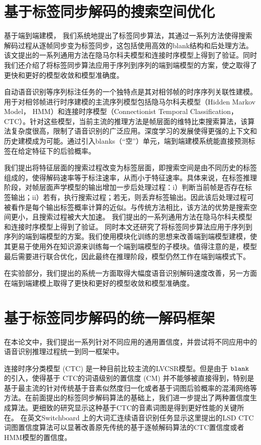 \section{基于标签同步解码的搜索空间优化}
\label{chap:sum-lsd}

基于端到端建模，
我们系统地提出了标签同步算法，其通过一系列方法使得搜索解码过程从逐帧同步变为标签同步，这包括使用高效的blank结构和后处理方法。该文提出的一系列通用方法在隐马尔科夫模型和连接时序模型上得到了验证。同时我们还介绍了将标签同步算法应用于序列到序列的端到端模型的方案，使之取得了更快和更好的模型收敛和模型准确度。


自动语音识别等序列标注任务的一个独特点是其对相邻帧的时序序列关联性建模。用于对相邻帧进行时序建模的主流序列模型包括隐马尔科夫模型（Hidden Markov Model， HMM）和连接时序模型（Connectionist Temporal Classification， CTC）。针对这些模型，当前主流的推理方法是帧层面的维特比束搜索算法，该算法复杂度很高，限制了语音识别的广泛应用。深度学习的发展使得更强的上下文和历史建模成为可能。通过引入blanks（“空”）单元，端到端建模系统能直接预测标签在给定特征下的后验概率。

我们提出将特征层面的搜索过程改变为标签层面，即搜索空间是由不同历史的标签组成的，使得解码速率等于标注速率，从而小于特征速率。具体来说，在标签推理阶段，对帧层面声学模型的输出增加一步后处理过程：i）判断当前帧是否存在标签输出；ii）若有，执行搜索过程；若无，则丢弃标签输出。因此该后处理过程可被看作是每个输出标签概率计算的近似。与传统方法相比，该方法的优势是搜索空间更小，且搜索过程被大大加速。
我们提出的一系列通用方法在隐马尔科夫模型和连接时序模型上得到了验证。
%
同时本文还研究了将标签同步算法应用于序列到序列的端到端模型的方案。我们使用模块化训练的思想来改善端到端模型建模，使其更易于使用外在知识源来训练每一个端到端模型的子模块。值得注意的是，模型最后需要进行联合优化，因此最终在推理阶段，模型仍然工作在端到端模式下。

在实验部分，我们提出的系统一方面取得大幅度语音识别解码速度改善，另一方面在端到端建模上取得了更快和更好的模型收敛和模型准确度。


\section{基于标签同步解码的统一解码框架}
\label{chap:sum-unify}
在本论文中，我们提出一系列针对不同应用的通用置信度，并尝试将不同应用中的语音识别推理过程统一到同一框架中。

连接时序分类模型 (CTC) 是一种目前比较主流的LVCSR模型。但是由于 $\tt blank$ 的引入，使得基于 CTC的词语级别的置信度 (CM) 并不能够被直接得到，特别是基于最主流的针对传统基于音素似然度归一化或者基于词图后验概率的混淆网络等方法。在前面提出的标签同步解码算法的基础上，我们进一步提出了两种置信度生成算法。更细致的研究显示这种基于CTC的音素词图是得到更好性能的关键所在。
在英文Switchboard 上的大词汇连续语音识别任务显示这里提出的LSD CTC 词图置信度算法可以显著改善原先传统的基于逐帧解码算法的CTC置信度或者 HMM模型的置信度。

